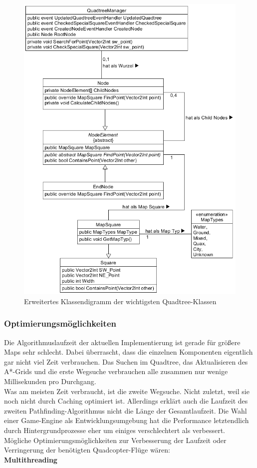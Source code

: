\documentclass[a4paper,12pt]{article}
\begin{document}
\begin{figure}[H]
    \centering
    \includegraphics[width=1\linewidth]{Bilder/Aufgabe3/Teilaufgabe_C/Klassendiagramm_Quadtree.png}
    \caption{Erweitertes Klassendigramm der wichtigsten Quadtree-Klassen}
\end{figure}

\subsubsection{Optimierungsmöglichkeiten}
Die Algorithmuslaufzeit der aktuellen Implementierung ist gerade für größere Maps sehr schlecht. Dabei überrascht, dass die einzelnen Komponenten eigentlich gar nicht viel Zeit verbrauchen. Das Suchen im Quadtree, das Aktualisieren des A*-Grids und die erste Wegsuche verbrauchen alle zusammen nur wenige Millisekunden pro Durchgang. 
\\[0.4cm]
Was am meisten Zeit verbraucht, ist die zweite Wegsuche. Nicht zuletzt, weil sie noch nicht durch Caching optimiert ist. Allerdings erklärt auch die Laufzeit des zweiten Pathfinding-Algorithmus nicht die Länge der Gesamtlaufzeit. Die Wahl einer Game-Engine als Entwicklungsumgebung hat die Performance letztendlich durch Hintergrundprozesse eher um einiges verschlechtert als verbessert.
\\[0.4cm]
Mögliche Optimierungsmöglichkeiten zur Verbesserung der Laufzeit oder Verringerung der benötigten Quadcopter-Flüge wären:
\\[0.4cm]
\textbf{Multithreading}
\end{document}
